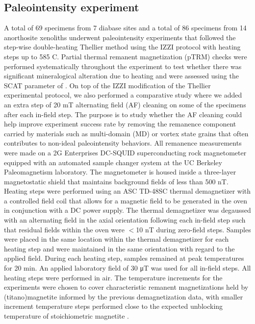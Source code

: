 \documentclass[draft]{agujournal2019}
\begin{document}
\subsection*{Paleointensity experiment}
A total of 69 specimens from 7 diabase sites and a total of 86 specimens from 14 anorthosite xenoliths underwent paleointensity experiments that followed the step-wise double-heating Thellier method \cite{Thellier1959a} using the IZZI protocol \cite{Tauxe2004a} with heating steps up to 585 \textdegree C. Partial thermal remanent magnetization (pTRM) checks were performed systematically throughout the experiment to test whether there was significant mineralogical alteration due to heating and were assessed using the SCAT parameter of . On top of the IZZI modification of the Thellier experimental protocol, we also performed a comparative study where we added an extra step of 20 mT alternating field (AF) cleaning on some of the specimens after each in-field step. The purpose is to study whether the AF cleaning could help improve experiment success rate by removing the remanence component carried by materials such as multi-domain (MD) or vortex state grains that often contributes to non-ideal paleointensity behaviors. All remanence measurements were made on a 2G Enterprises DC-SQUID superconducting rock magnetometer equipped with an automated sample changer system at the UC Berkeley Paleomagnetism laboratory. The magnetometer is housed inside a three-layer magnetostatic shield that maintains background fields of less than 500 nT. Heating steps were performed using an ASC TD-48SC thermal demagnetizer with a controlled field coil that allows for a magnetic field to be generated in the oven in conjunction with a DC power supply. The thermal demagnetizer was degaussed with an alternating field in the axial orientation following each in-field step such that residual fields within the oven were $<$10 nT during zero-field steps. Samples were placed in the same location within the thermal demagnetizer for each heating step and were maintained in the same orientation with regard to the applied field. During each heating step, samples remained at peak temperatures for 20 min. An applied laboratory field of 30 μT was used for all in-field steps. All heating steps were performed in air. The temperature increments for the experiments were chosen to cover characteristic remanent magnetizations held by (titano)magnetite informed by the previous demagnetization data, with smaller increment temperature steps performed close to the expected unblocking temperature of stoichiometric magnetite \cite{Zhang2021b}. 
\end{document}
